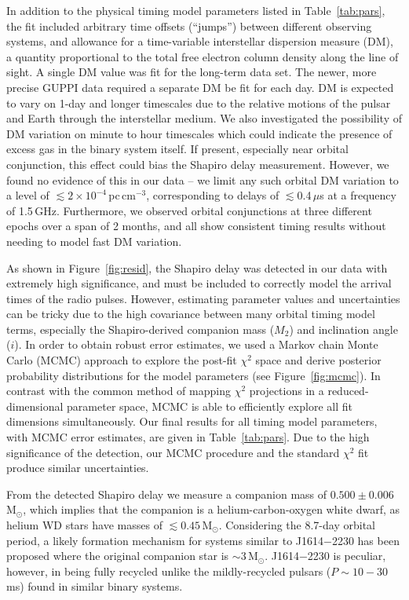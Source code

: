 \documentclass[12pt]{article}
\newcommand{\msun}{M$_\odot$}
\begin{document}
In addition to the physical timing model parameters listed in
Table~\ref{tab:pars}, the fit included arbitrary time offsets
(``jumps'') between different observing systems, and allowance for a
time-variable interstellar dispersion measure (DM), a quantity
proportional to the total free electron column density along the line of
sight.  A single DM value was fit for the long-term data set.  The
newer, more precise GUPPI data required a separate DM be fit for each
day.  DM is expected to vary on 1-day and longer timescales due to the
relative motions of the pulsar and Earth through the interstellar
medium\cite{rdb+06}.  We also investigated the possibility of DM
variation on minute to hour timescales which could indicate the presence
of excess gas in the binary system itself.  If present, especially near
orbital conjunction, this effect could bias the Shapiro delay
measurement.  However, we found no evidence of this in our data -- we
limit any such orbital DM variation to a level of $\lesssim
2\times10^{-4}$\,pc\,cm$^{-3}$, corresponding to delays of
$\lesssim$0.4\,$\mu$s at a frequency of 1.5\,GHz.  Furthermore, we
observed orbital conjunctions at three different epochs over a span of 2
months, and all show consistent timing results without needing to model
fast DM variation.

As shown in Figure~\ref{fig:resid}, the Shapiro delay was detected in
our data with extremely high significance, and must be included to
correctly model the arrival times of the radio pulses.  However,
estimating parameter values and uncertainties can be tricky due to the
high covariance between many orbital timing model terms, especially
the Shapiro-derived companion mass ($M_2$) and inclination angle
($i$)\cite{dd86}.  In order to obtain robust error estimates, we used
a Markov chain Monte Carlo (MCMC) approach to explore the post-fit
$\chi^2$ space and derive posterior probability distributions for the
model parameters (see Figure~\ref{fig:mcmc}).  In contrast with the
common method of mapping $\chi^2$ projections in a reduced-dimensional
parameter space\cite{vbb+02,jhb+05}, MCMC is able to efficiently
explore all fit dimensions simultaneously.  Our final results for all
timing model parameters, with MCMC error estimates, are given in
Table~\ref{tab:pars}.  Due to the high significance of the detection,
our MCMC procedure and the standard $\chi^2$ fit produce similar
uncertainties.

From the detected Shapiro delay we measure a companion mass of
$0.500\pm0.006$\,\msun, which implies that the companion is a
helium-carbon-oxygen white dwarf, as helium WD stars have masses of
$\lesssim0.45$\,\msun\cite{kw90}.  Considering the 8.7-day orbital
period, a likely formation mechanism for systems similar to
J1614$-$2230 has been proposed\cite{pr00,prp02} where the original
companion star is $\sim$3\,\msun.  J1614$-$2230 is peculiar, however,
in being fully recycled unlike the mildly-recycled pulsars
($P\sim10-30$\,ms) found in similar binary systems.
\end{document}

